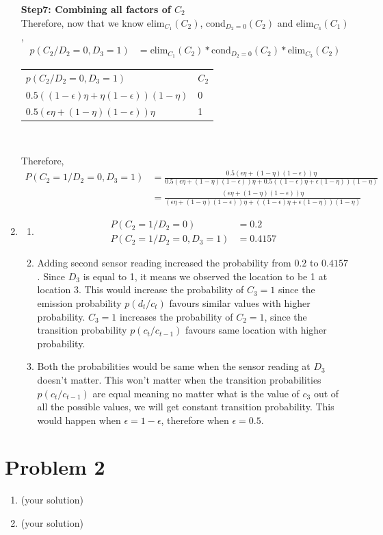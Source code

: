 \documentclass[12pt]{article}
\begin{document}
\begin{enumerate}[label=(\alph*)]
  \textbf{Step7: Combining all factors of $C_2$} \\
    Therefore, now that we know elim$_{C_1}(C_2)$, cond$_{D_2 = 0} (C_2)$ and elim$_{C_3}(C_1)$,
  \begin{align*}
  p(C_2/ D_2 = 0, D_3 = 1) &= \text{elim}_{C_1}(C_2) * \text{cond}_{D_2 = 0} (C_2) * \text{elim}_{C_3}(C_2)
  \end{align*}
  \begin{center}
  \begin{tabular}{ll}
  $p(C_2/ D_2 = 0, D_3 = 1)$ & $C_2$  \\
  $0.5((1 - \epsilon) \eta + \eta (1- \epsilon)) (1 - \eta)$            & 0       \\
  $0.5(\epsilon \eta + (1- \eta) (1 - \epsilon)) \eta$               & 1       \\
  \end{tabular} \newline \\
  \end{center}
  Therefore, 
  \begin{align*}
  P(C_2 = 1/D_2 = 0, D_3 = 1) &= \frac{0.5 (\epsilon \eta + (1- \eta) (1 - \epsilon)) \eta}{0.5(\epsilon \eta + (1- \eta) (1 - \epsilon)) \eta + 0.5 ((1 - \epsilon) \eta + \epsilon (1- \eta)) (1 - \eta)} \\
  &= \frac{(\epsilon \eta + (1- \eta) (1 - \epsilon)) \eta}{(\epsilon \eta + (1- \eta) (1 - \epsilon)) \eta + ((1 - \epsilon) \eta + \epsilon (1- \eta)) (1 - \eta)}
  \end{align*}
  \item
  \begin{enumerate}[label=\roman*.]
  \item
  \begin{align*}
  P(C_2 = 1/D_2 = 0) &= 0.2 \\
  P(C_2 = 1/D_2 = 0, D_3 = 1) &= 0.4157
  \end{align*}
  \item
  Adding second sensor reading increased the probability from $0.2$ to $0.4157$. Since $D_3$ is equal to 1, it means we observed the location to be 1 at location 3. This would increase the probability of $C_3 = 1$ since the emission probability $p(d_t/c_t)$ favours similar values with higher probability. $C_3 = 1$ increases the probability of $C_2 = 1$, since the transition probability $p(c_t/c_{t-1})$ favours same location with higher probability.
  \item Both the probabilities would be same when the sensor reading at $D_3$ doesn't matter. This won't matter when the transition probabilities $p(c_t/c_{t-1})$ are equal meaning no matter what is the value of $c_3$ out of all the possible values, we will get constant transition probability. This would happen when $\epsilon = 1 - \epsilon$, therefore when $\epsilon = 0.5$. 
  
  \end{enumerate}
\end{enumerate}

\section*{Problem 2}

\begin{enumerate}[label=(\alph*)]
  \item (your solution)
  \item (your solution)
\end{enumerate}
\end{document}
